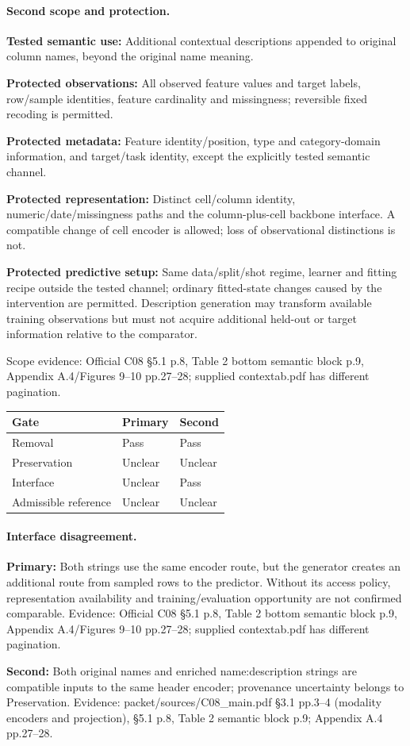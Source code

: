 \documentclass[10pt]{article}
\begin{document}
\paragraph{Second scope and protection.}
\textbf{Tested semantic use:} Additional contextual descriptions appended to original column names, beyond the original name meaning.\par
\textbf{Protected observations:} All observed feature values and target labels, row/sample identities, feature cardinality and missingness; reversible fixed recoding is permitted.\par
\textbf{Protected metadata:} Feature identity/position, type and category-domain information, and target/task identity, except the explicitly tested semantic channel.\par
\textbf{Protected representation:} Distinct cell/column identity, numeric/date/missingness paths and the column-plus-cell backbone interface. A compatible change of cell encoder is allowed; loss of observational distinctions is not.\par
\textbf{Protected predictive setup:} Same data/split/shot regime, learner and fitting recipe outside the tested channel; ordinary fitted-state changes caused by the intervention are permitted. Description generation may transform available training observations but must not acquire additional held-out or target information relative to the comparator.\par
Scope evidence: Official C08 §5.1 p.8, Table 2 bottom semantic block p.9, Appendix A.4/Figures 9--10 pp.27--28; supplied contextab.pdf has different pagination.\par
\begin{tabular}{lll}\toprule Gate & Primary & Second \\ \midrule
Removal & Pass & Pass \\
Preservation & Unclear & Unclear \\
Interface & Unclear & Pass \\
Admissible reference & Unclear & Unclear \\
\bottomrule\end{tabular}
\paragraph{Interface disagreement.}
\textbf{Primary:} Both strings use the same encoder route, but the generator creates an additional route from sampled rows to the predictor. Without its access policy, representation availability and training/evaluation opportunity are not confirmed comparable. Evidence: Official C08 §5.1 p.8, Table 2 bottom semantic block p.9, Appendix A.4/Figures 9--10 pp.27--28; supplied contextab.pdf has different pagination.\par
\textbf{Second:} Both original names and enriched name:description strings are compatible inputs to the same header encoder; provenance uncertainty belongs to Preservation. Evidence: packet/sources/C08\_main.pdf §3.1 pp.3--4 (modality encoders and projection), §5.1 p.8, Table 2 semantic block p.9; Appendix A.4 pp.27--28.\par
\end{document}

